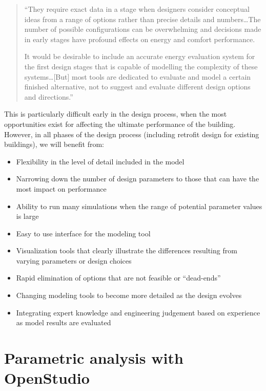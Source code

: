 \documentclass[10pt]{article}
\begin{document}
\begin{quote}
``They require exact data in a stage when designers consider conceptual ideas from a range of options rather than precise details and numbers\ldots The number of possible
configurations can be overwhelming and decisions made in early stages have profound effects on energy and comfort performance. 

It would be desirable to include an accurate energy evaluation system for the first design stages that is capable of modelling the complexity of these systems\ldots[But] most tools are dedicated to evaluate and model a certain finished alternative, not to suggest and evaluate different design options and directions.'' \cite{Ochoa2009-pn}
    
\end{quote}

This is particularly difficult early in the design process, when the most opportunities exist for affecting the ultimate performance of the building. However, in all phases of the design process (including retrofit design for existing buildings), we will benefit from:

\begin{itemize}
    \setlength{\itemsep}{0pt}%
    \setlength{\parskip}{0pt}%
    \item Flexibility in the level of detail included in the model
    \item Narrowing down the number of design parameters to those that can have the most impact on performance \cite{Samuelson2016-xw}
        \item Ability to run many simulations when the range of potential parameter values is large
    \item Easy to use interface for the modeling tool \cite{Ochoa2009-pn}
    \item Visualization tools that clearly illustrate the differences resulting from varying parameters or design choices
    \item Rapid elimination of options that are not feasible or ``dead-ends'' \cite{Ochoa2009-pn}
        \item Changing modeling tools to become more detailed as the design evolves \cite{Samuelson2016-xw}
    \item Integrating expert knowledge and engineering judgement based on experience as model results are evaluated
\end{itemize}



\section{Parametric analysis with OpenStudio}
\end{document}
